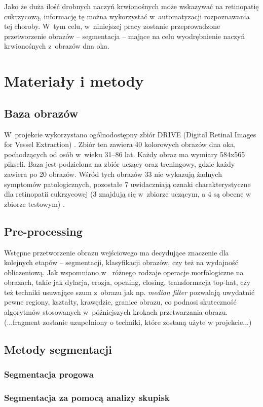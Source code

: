 \documentclass[conference]{IEEEtran}
\begin{document}
Jako że duża ilość drobnych naczyń krwionośnych może wskazywać na retinopatię cukrzycową, informację tę można wykorzystać w~automatyzacji rozpoznawania tej choroby. W~tym celu, w~niniejszej pracy zostanie przeprowadzone przetworzenie obrazów -- segmentacja -- mające na celu wyodrębnienie naczyń krwionośnych z~obrazów dna oka.

\section{Materiały i metody}
\subsection{Baza obrazów}
W~projekcie wykorzystano ogólnodostępny zbiór DRIVE (Digital Retinal Images for Vessel Extraction) \cite{b6}. Zbiór ten zawiera 40 kolorowych obrazów dna oka, pochodzących od osób w~wieku 31--86 lat. Każdy obraz ma wymiary 584x565 pikseli. Baza jest podzielona na zbiór uczący oraz treningowy, gdzie każdy zawiera po 20 obrazów. Wśród tych obrazów 33 nie wykazują żadnych symptomów patologicznych, pozostałe 7 uwidaczniają oznaki charakterystyczne dla retinopatii cukrzycowej (3 znajdują się w~zbiorze uczącym, a 4 są obecne w zbiorze testowym) \cite{b4}.
\subsection{Pre-processing}
Wstępne przetworzenie obrazu wejściowego ma decydujące znaczenie dla kolejnych etapów -- segmentacji, klasyfikacji obrazów, czy też na wydajność obliczeniową. Jak wspomniano w~\cite{b5} różnego rodzaje operacje morfologiczne na obrazach, takie jak dylacja, erozja, opening, closing, transformacja top-hat, czy też techniki usuwające szum z~obrazu jak np. \textit{median filter} pozwalają uwydatnić pewne regiony, kształty, krawędzie, granice obrazu, co podnosi skuteczność algorytmów stosowanych w~późniejszych krokach przetwarzania obrazu. 
(...fragment zostanie uzupełniony o techniki, które zostaną użyte w projekcie...)

\subsection{Metody segmentacji}
\subsubsection{Segmentacja progowa}
\subsubsection{Segmentacja za pomocą analizy skupisk}
\end{document}

